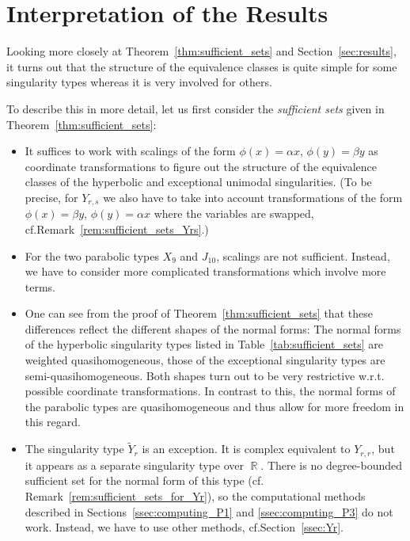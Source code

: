 \documentclass[noend]{amsproc}
\theoremstyle{definition}
\newcommand{\tY}{\widetilde{Y}}
\DeclareMathOperator{\R}{\mathbb{R}}
\begin{document}
\section{Interpretation of the Results}\label{sec:interpretation}

Looking more closely at Theorem~\ref{thm:sufficient_sets} and
Section~\ref{sec:results}, it turns out that the structure of the equivalence
classes is quite simple for some singularity types whereas it is very involved
for others.

To describe this in more detail, let us first consider the \emph{sufficient
sets} given in Theorem~\ref{thm:sufficient_sets}:
\begin{itemize}
\item
It suffices to work with scalings of the form $\phi(x) = \alpha x$,
$\phi(y) = \beta y$ as coordinate transformations to figure out the structure
of the equivalence classes of the hyperbolic and exceptional unimodal
singularities. (To be precise, for $Y_{r,s}$ we also have to take into account
transformations of the form $\phi(x) = \beta y$, $\phi(y) = \alpha x$ where the
variables are swapped, cf.\@ Remark~\ref{rem:sufficient_sets_Yrs}.)
\item
For the two parabolic types $X_9$ and $J_{10}$, scalings are not sufficient.
Instead, we have to consider more complicated transformations which involve
more terms.
\item
One can see from the proof of Theorem~\ref{thm:sufficient_sets} that these
differences reflect the different shapes of the normal forms: The normal forms
of the hyperbolic singularity types listed in Table~\ref{tab:sufficient_sets}
are weighted quasihomogeneous, those of the exceptional singularity types are
semi-quasihomogeneous. Both shapes turn out to be very restrictive w.r.t.\@
possible coordinate transformations. In contrast to this, the normal forms of
the parabolic types are quasihomogeneous and thus allow for more freedom in
this regard.
\item
The singularity type $\tY_r$ is an exception. It is complex equivalent to
$Y_{r,r}$, but it appears as a separate singularity type over $\R$. There is no
degree-bounded sufficient set for the normal form of this type (cf.\@
Remark~\ref{rem:sufficient_sets_for_Yr}), so the computational methods
described in Sections~\ref{ssec:computing_P1} and \ref{ssec:computing_P3} do
not work. Instead, we have to use other methods, cf.\@ Section~\ref{ssec:Yr}.
\end{itemize}
\end{document}
